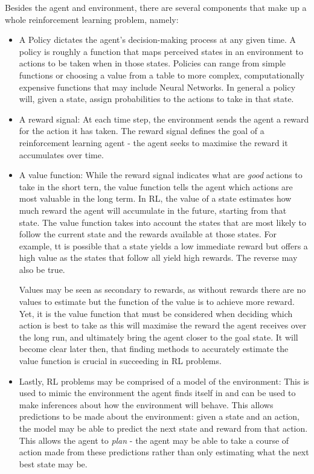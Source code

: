 \documentclass{article}
\begin{document}
Besides the agent and environment, there are several components that make up a whole reinforcement learning problem\cite{Sutton1998}, namely: 

\begin{itemize}
    \item A Policy dictates the agent's decision-making process at any given time. A policy is roughly a function that maps perceived states in an environment to actions to be taken when in those states. Policies can range from simple functions or choosing a value from a table to more complex, computationally expensive functions that may include Neural Networks. In general a policy will, given a state, assign probabilities to the actions to take in that state. 
    
    \item A reward signal: At each time step, the environment sends the agent a reward for the action it has taken. The reward signal defines the goal of a reinforcement learning agent - the agent seeks to maximise the reward it accumulates over time.
    
    \item A value function: While the reward signal indicates what are \textit{good} actions to take in the short tern, the value function tells the agent which actions are most valuable in the long term. In RL, the value of a state estimates how much reward the agent will accumulate in the future, starting from that state. The value function takes into account the states that are most likely to follow the current state and the rewards available at those states. For example, tt is possible that a state yields a low immediate reward but offers a high value as the states that follow all yield high rewards. The reverse may also be true.
    
    Values may be seen as secondary to rewards, as without rewards there are no values to estimate but the function of the value is to achieve more reward. Yet, it is the value function that must be considered when deciding which action is best to take as this will maximise the reward the agent receives over the long run, and ultimately bring the agent closer to the goal state. It will become clear later then, that finding methods to accurately estimate the value function is crucial in succeeding in RL problems.
    
    \item Lastly, RL problems may be comprised of a model of the environment: This is used to mimic the environment the agent finds itself in and can be used to make inferences about how the environment will behave. This allows predictions to be made about the environment: given a state and an action, the model may be able to predict the next state and reward from that action. This allows the agent to \textit{plan} - the agent may be able to take a course of action made from these predictions rather than only estimating what the next best state may be.
    
\end{itemize}
\end{document}
